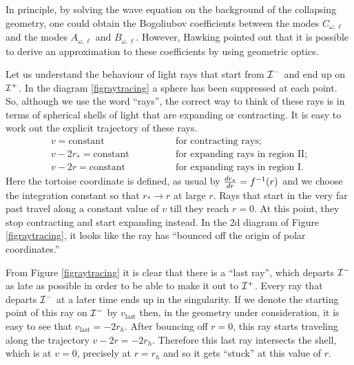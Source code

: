 \documentclass[12pt]{article}
\def\rtor{{r_*}}
\newcommand{\be}{\begin{equation}}
\newcommand{\ee}{\end{equation}}
\def \scrip{{\cal I}^{+}}
\def \scrim{{\cal I}^{-}}
\begin{document}
In principle, by solving the wave equation on the background of the collapsing geometry, one could obtain the Bogoliubov coefficients between the modes $C_{\omega, \ell}$ and the modes $A_{\omega, \ell}$ and $B_{\omega, \ell}$. However, Hawking pointed out that it is possible to derive an approximation to these coefficients by using geometric optics.

Let us understand the behaviour of light rays that start from $\scrim$ and end up on $\scrip$. In the diagram \ref{figraytracing} a sphere has been suppressed at each point. So, although we use the word ``rays'', the correct way to think of these rays is in terms of  spherical shells of light that are expanding or contracting. It is easy to work out the explicit trajectory of these rays. 
\be
\begin{array}{ll}
v = \text{constant} \qquad & \qquad \text{for~contracting~rays}; \\
v - 2 \rtor = \text{constant} \qquad &\qquad \text{for~expanding~rays~in~region~II}; \\
v - 2 r = \text{constant} \qquad &\qquad \text{for~expanding~rays~in~region~I}.
\end{array}
\ee
Here the tortoise coordinate is defined, as usual by ${d \rtor \over d r} = f^{-1}(r)$ and we choose the integration constant so that $\rtor \rightarrow r$ at large $r$.
Rays that start in the very far past travel along a constant value of $v$ till they reach $r = 0$. At this point, they stop contracting and start expanding instead. In the 2d diagram of Figure \ref{figraytracing}, it looks like the ray has ``bounced off the origin of polar coordinates.'' 

From Figure \ref{figraytracing} it is clear that there is a ``last ray'', which departs $\scrim$ as late as possible in order to be able to make it out to $\scrip$. Every ray that departs $\scrim$ at a later time ends up in the singularity.  If we denote the starting point of this ray on $\scrim$ by $v_{\text{last}}$ then, in the geometry under consideration, it is easy to see that $v_{\text{last}} = -2 r_h$.   After bouncing off $r = 0$, this ray starts traveling along the trajectory $v - 2 r = -2 r_h$. Therefore this last ray intersects the shell, which is at $v =0$, precisely at $r = r_h$ and so it gets ``stuck'' at this value of $r$.  
\end{document}
